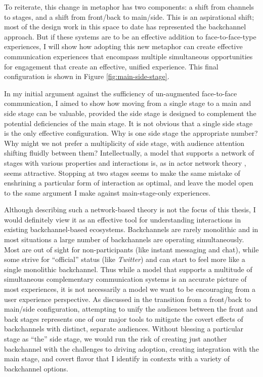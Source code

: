 To reiterate, this change in metaphor has two components: a shift from channels to stages, and a shift from front/back to main/side. This is an aspirational shift; most of the design work in this space to date has represented the backchannel approach. But if these systems are to be an effective addition to face-to-face-type experiences, I will show how adopting this new metaphor can create effective communication experiences that encompass multiple simultaneous opportunities for engagement that create an effective, unified experience. This final configuration is shown in Figure \ref{fig:main-side-stage}. 


In my initial argument against the sufficiency of un-augmented face-to-face communication, I aimed to show how moving from a single stage to a main and side stage can be valuable, provided the side stage is designed to complement the potential deficiencies of the main stage. It is not obvious that a single side stage is the only effective configuration. Why is one side stage the appropriate number? Why might we not prefer a multiplicity of side stage, with audience attention shifting fluidly between them? Intellectually, a model that supports a network of stages with various properties and interactions is, as in actor network theory \citep{latour_reassembling_2007}, seems attractive. Stopping at two stages seems to make the same mistake of enshrining a particular form of interaction as optimal, and leave the model open to the same argument I make against main-stage-only experiences.

Although describing such a network-based theory is not the focus of this thesis, I would definitely view it as an effective tool for understanding interactions in existing backchannel-based ecosystems. Backchannels are rarely monolithic and in most situations a large number of backchannels are operating simultaneously. Most are out of sight for non-participants (like instant messaging and chat), while some strive for ``official'' status (like \emph{Twitter}) and can start to feel more like a single monolithic backchannel. Thus while a model that supports a multitude of simultaneous complementary communication systems is an accurate picture of most experiences, it is not necessarily a model we want to be encouraging from a user experience perspective. As discussed in the transition from a front/back to main/side configuration, attempting to unify the audiences between the front and back stages represents one of our major tools to mitigate the covert effects of backchannels with distinct, separate audiences. Without blessing a particular stage as ``the'' side stage, we would run the risk of creating just another backchannel with the challenges to driving adoption, creating integration with the main stage, and covert flavor that I identify in contexts with a variety of backchannel options.

